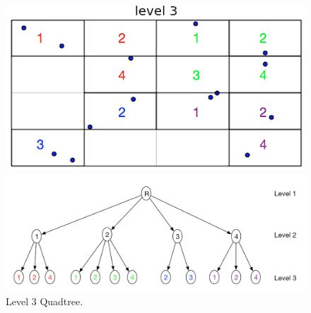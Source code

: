 \begin{figure}[H]
  \centering
  \vspace{0.5in}
  \begin{minipage}[b]{0.35\textwidth}
    \includegraphics[width=\textwidth]{Images/Quadtree_basic_scenario8}
  \end{minipage}
  \hfill
  \begin{minipage}[b]{0.6\textwidth}
    \includegraphics[width=\textwidth]{Images/L3_Tree}
  \end{minipage}
  \vspace{0.5in}
  \caption{Level 3 Quadtree.}
  \label{fig:level3quadtree}
\end{figure}

